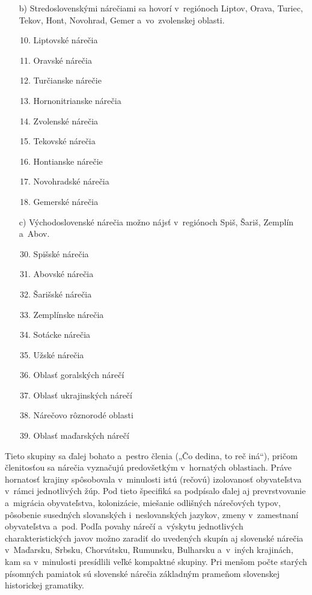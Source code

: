\begin{multicols}{2}
\begin{itemize}
\item[b)] Stredoslovenskými nárečiami sa hovorí v~regiónoch Liptov, Orava, Turiec, Tekov, Hont, Novohrad, Gemer a~vo~zvolenskej oblasti.

\begin{enumerate}
\setcounter{enumi}{9}
\item Liptovské nárečia
\item Oravské nárečia
\item Turčianske nárečie
\item Hornonitrianske nárečia
\item Zvolenské nárečia
\item Tekovské nárečia
\item Hontianske nárečie
\item Novohradské nárečia
\item Gemerské nárečia
\end{enumerate}

\item[c)] Východoslovenské nárečia možno nájsť v~regiónoch Spiš, Šariš, Zemplín a~Abov.

\begin{enumerate}
\setcounter{enumi}{29}
\item Spišské nárečia
\item Abovské nárečia
\item Šarišské nárečia
\item Zemplínske nárečia
\item Sotácke nárečia
\item Užské nárečia
\setcounter{enumi}{39}
\item Oblasť goralských nárečí
\item Oblasť ukrajinských nárečí
\item Nárečovo rôznorodé oblasti 
\item Oblasť maďarských nárečí
\end{enumerate}
\end{itemize}

\medskip

Tieto skupiny sa ďalej bohato a~pestro členia („Čo dedina, to reč iná“), pričom členitosťou sa nárečia vyznačujú predovšetkým v~hornatých oblastiach. Práve hornatosť krajiny spôsobovala v~minulosti istú (rečovú) izolovanosť obyvateľstva v~rámci jednotlivých žúp. Pod tieto špecifiká sa podpísalo ďalej aj prevrstvovanie a~migrácia obyvateľstva, kolonizácie, miešanie odlišných nárečových typov, pôsobenie susedných slovanských i~neslovanských jazykov, zmeny v~zamestnaní obyvateľstva a~pod. Podľa povahy nárečí a~výskytu jednotlivých charakteristických javov možno zaradiť do uvedených skupín aj slovenské nárečia v~Maďarsku, Srbsku, Chorvátsku, Rumunsku, Bulharsku a~v~iných krajinách, kam sa v~minulosti presídlili veľké kompaktné skupiny. Pri menšom počte starých písomných pamiatok sú slovenské nárečia základným prameňom slovenskej historickej gramatiky.


\end{multicols}
